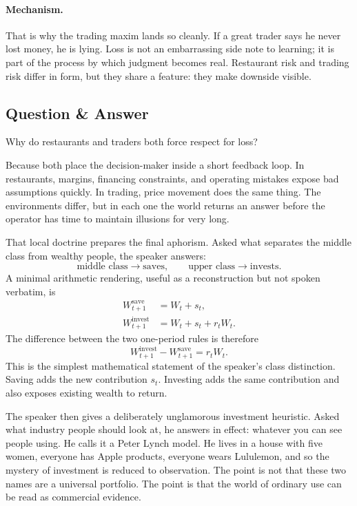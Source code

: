 \paragraph{Mechanism.}
That is why the trading maxim lands so cleanly. If a great trader says he never lost money, he is lying. Loss is not an embarrassing side note to learning; it is part of the process by which judgment becomes real. Restaurant risk and trading risk differ in form, but they share a feature: they make downside visible.

\subsection{Question \& Answer}

Why do restaurants and traders both force respect for loss?

Because both place the decision-maker inside a short feedback loop. In restaurants, margins, financing constraints, and operating mistakes expose bad assumptions quickly. In trading, price movement does the same thing. The environments differ, but in each one the world returns an answer before the operator has time to maintain illusions for very long.

That local doctrine prepares the final aphorism. Asked what separates the middle class from wealthy people, the speaker answers:
\begin{equation}
\text{middle class} \to \text{saves},
\qquad
\text{upper class} \to \text{invests}.
\end{equation}
A minimal arithmetic rendering, useful as a reconstruction but not spoken verbatim, is
\begin{align}
W_{t+1}^{\text{save}} &= W_t + s_t,\\
W_{t+1}^{\text{invest}} &= W_t + s_t + r_t W_t.
\end{align}
The difference between the two one-period rules is therefore
\begin{equation}
W_{t+1}^{\text{invest}} - W_{t+1}^{\text{save}} = r_t W_t.
\end{equation}
This is the simplest mathematical statement of the speaker's class distinction. Saving adds the new contribution \(s_t\). Investing adds the same contribution and also exposes existing wealth to return.

The speaker then gives a deliberately unglamorous investment heuristic. Asked what industry people should look at, he answers in effect: whatever you can see people using. He calls it a Peter Lynch model. He lives in a house with five women, everyone has Apple products, everyone wears Lululemon, and so the mystery of investment is reduced to observation. The point is not that these two names are a universal portfolio. The point is that the world of ordinary use can be read as commercial evidence.

